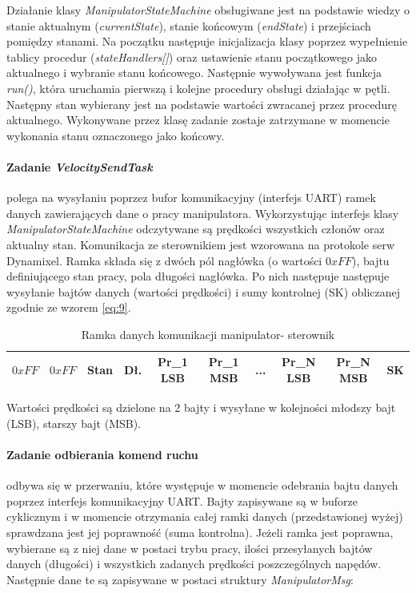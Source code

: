 \documentclass[a4paper, 12pt, twoside]{article}
\begin{document}
Działanie klasy \textit{ManipulatorStateMachine} obsługiwane jest na podstawie wiedzy o stanie aktualnym (\textit{currentState}), stanie końcowym (\textit{endState}) i przejściach pomiędzy stanami. Na początku następuje inicjalizacja klasy poprzez wypełnienie tablicy procedur (\textit{stateHandlers[]}) oraz ustawienie stanu początkowego jako aktualnego i wybranie stanu końcowego. Następnie wywoływana jest funkcja \textit{run()}, która uruchamia pierwszą i kolejne procedury obsługi działając w pętli. Następny stan wybierany jest na podstawie wartości zwracanej przez procedurę aktualnego. Wykonywane przez klasę zadanie zostaje zatrzymane w momencie wykonania stanu oznaczonego jako końcowy.

\newpage
\paragraph{Zadanie \textit{VelocitySendTask}} polega na wysyłaniu poprzez bufor komunikacyjny (interfejs UART) ramek danych zawierających dane o pracy manipulatora. Wykorzystując interfejs klasy \textit{ManipulatorStateMachine} odczytywane są prędkości wszystkich członów oraz aktualny stan. Komunikacja ze sterownikiem jest wzorowana na protokole serw Dynamixel. Ramka składa się z dwóch pól nagłówka (o wartości $0xFF$), bajtu definiującego stan pracy, pola długości nagłówka. Po nich następuje następuje wysyłanie bajtów danych (wartości prędkości) i sumy kontrolnej (SK) obliczanej zgodnie ze wzorem \eqref{eq:9}. 

\begin{table}[htb!]
\label{comm}
\begin{center}
\caption{Ramka danych komunikacji manipulator- sterownik }
\begin{tabular}{ | c | c | c | c | c | c | c | c | c | c | }
\hline
 $0xFF$ & $0xFF$ & Stan & Dł. & Pr\_1 LSB & Pr\_1 MSB & ... & Pr\_N LSB & Pr\_N MSB & SK \\ 
\hline
\end{tabular}
\end{center}
\end{table}

Wartości prędkości są dzielone na 2 bajty i wysyłane w kolejności młodszy bajt (LSB), starszy bajt (MSB).

\paragraph{Zadanie odbierania komend ruchu} odbywa się w przerwaniu, które występuje w momencie odebrania bajtu danych poprzez interfejs komunikacyjny UART. Bajty zapisywane są w buforze cyklicznym i w momencie otrzymania całej ramki danych (przedstawionej wyżej) sprawdzana jest jej poprawność (suma kontrolna). Jeżeli ramka jest poprawna, wybierane są z niej dane w postaci trybu pracy, ilości przesyłanych bajtów danych (długości) i wszystkich zadanych prędkości poszczególnych napędów. Następnie dane te są zapisywane w postaci struktury \textit{ManipulatorMsg}:
\end{document}

